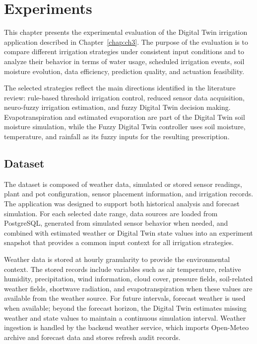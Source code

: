 \chapter{Experiments}
\label{chap:ch4}

\par This chapter presents the experimental evaluation of the Digital Twin irrigation
    application described in Chapter~\ref{chap:ch3}. The purpose of the evaluation is to
    compare different irrigation strategies under consistent input conditions and to
    analyze their behavior in terms of water usage, scheduled irrigation events, soil
    moisture evolution, data efficiency, prediction quality, and actuation feasibility.

\par The selected strategies reflect the main directions identified in the literature
    review: rule-based threshold irrigation control, reduced sensor data acquisition,
    neuro-fuzzy irrigation estimation, and fuzzy Digital Twin decision making.
    Evapotranspiration and estimated evaporation are part of the Digital Twin soil
    moisture simulation, while the Fuzzy Digital Twin controller uses soil moisture,
    temperature, and rainfall as its fuzzy inputs for the resulting prescription.

\section{Dataset}
\label{sec:ch4sec1}

\par The dataset is composed of weather data, simulated or stored sensor readings, plant
    and pot configuration, sensor placement information, and irrigation records. The
    application was designed to support both historical analysis and forecast simulation.
    For each selected date range, data sources are loaded from PostgreSQL, generated from
    simulated sensor behavior when needed, and combined with estimated weather or Digital
    Twin state values into an experiment snapshot that provides a common input context for
    all irrigation strategies.

\par Weather data is stored at hourly granularity to provide the environmental context.
    The stored records include variables such as air temperature, relative humidity,
    precipitation, wind information, cloud cover, pressure fields, soil-related weather
    fields, shortwave radiation, and evapotranspiration when these values are available
    from the weather source. For future intervals, forecast weather is used when
    available; beyond the forecast horizon, the Digital Twin estimates missing weather and
    state values to maintain a continuous simulation interval. Weather ingestion is
    handled by the backend weather service, which imports Open-Meteo archive and forecast
    data and stores refresh audit records.

